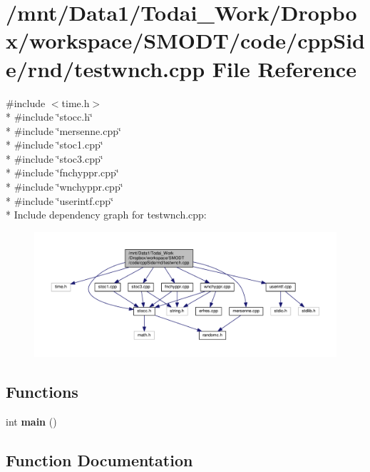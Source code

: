 \section{/mnt/\-Data1/\-Todai\-\_\-\-Work/\-Dropbox/workspace/\-S\-M\-O\-D\-T/code/cpp\-Side/rnd/testwnch.cpp File Reference}
\label{rnd_2testwnch_8cpp}
{\ttfamily \#include $<$time.\-h$>$}\\*
{\ttfamily \#include \char`\"{}stocc.\-h\char`\"{}}\\*
{\ttfamily \#include \char`\"{}mersenne.\-cpp\char`\"{}}\\*
{\ttfamily \#include \char`\"{}stoc1.\-cpp\char`\"{}}\\*
{\ttfamily \#include \char`\"{}stoc3.\-cpp\char`\"{}}\\*
{\ttfamily \#include \char`\"{}fnchyppr.\-cpp\char`\"{}}\\*
{\ttfamily \#include \char`\"{}wnchyppr.\-cpp\char`\"{}}\\*
{\ttfamily \#include \char`\"{}userintf.\-cpp\char`\"{}}\\*
Include dependency graph for testwnch.\-cpp\-:\nopagebreak
\begin{figure}[H]
\begin{center}
\leavevmode
\includegraphics[width=350pt]{rnd_2testwnch_8cpp__incl}
\end{center}
\end{figure}
\subsection*{Functions}
\begin{DoxyCompactItemize}
\item 
int {\bf main} ()
\end{DoxyCompactItemize}


\subsection{Function Documentation}
